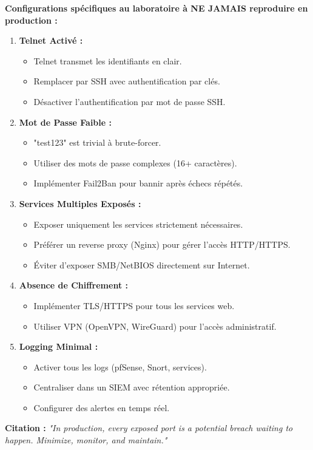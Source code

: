 \documentclass[12pt,a4paper,openany]{report}
\begin{document}
	\begin{tcolorbox}[colback=accent!5!white, colframe=accent, title=\textbf{⚠️ AVERTISSEMENTS CRITIQUES}]
		\textbf{Configurations spécifiques au laboratoire à NE JAMAIS reproduire en production :}
		
		\begin{enumerate}
			\item \textbf{Telnet Activé :}
			\begin{itemize}
				\item Telnet transmet les identifiants en clair.
				\item Remplacer par SSH avec authentification par clés.
				\item Désactiver l'authentification par mot de passe SSH.
			\end{itemize}
			
			\item \textbf{Mot de Passe Faible :}
			\begin{itemize}
				\item "test123" est trivial à brute-forcer.
				\item Utiliser des mots de passe complexes (16+ caractères).
				\item Implémenter Fail2Ban pour bannir après échecs répétés.
			\end{itemize}
			
			\item \textbf{Services Multiples Exposés :}
			\begin{itemize}
				\item Exposer uniquement les services strictement nécessaires.
				\item Préférer un reverse proxy (Nginx) pour gérer l'accès HTTP/HTTPS.
				\item Éviter d'exposer SMB/NetBIOS directement sur Internet.
			\end{itemize}
			
			\item \textbf{Absence de Chiffrement :}
			\begin{itemize}
				\item Implémenter TLS/HTTPS pour tous les services web.
				\item Utiliser VPN (OpenVPN, WireGuard) pour l'accès administratif.
			\end{itemize}
			
			\item \textbf{Logging Minimal :}
			\begin{itemize}
				\item Activer tous les logs (pfSense, Snort, services).
				\item Centraliser dans un SIEM avec rétention appropriée.
				\item Configurer des alertes en temps réel.
			\end{itemize}
		\end{enumerate}
		
		\textbf{Citation :}
		\textit{"In production, every exposed port is a potential breach waiting to happen. Minimize, monitor, and maintain."}
	\end{tcolorbox}
	
\end{document}
